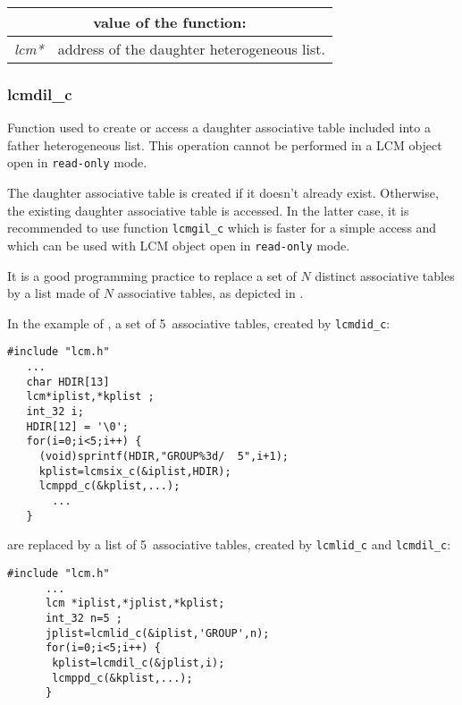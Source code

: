 \vskip 0.8cm

\noindent
\begin{tabular}{|p{4.0cm}|p{11cm}|}
\hline
\multicolumn{2}{|c|}{\bf value of the function:} \\
\hline
{\it lcm*} & address of the daughter heterogeneous list. \\
\hline
\end{tabular}

\subsubsection{lcmdil\_c}

Function used to create or access a daughter associative table included into a father heterogeneous list. This operation cannot be
performed in a LCM object open in {\tt read-only} mode.

\vskip 0.2cm

The daughter associative table is created if it doesn't already exist. Otherwise, the
existing daughter associative table is accessed. In the latter case, it is recommended
to use function {\tt lcmgil\_c} which is faster for a simple access and which can be used
with LCM object open in {\tt read-only} mode.

\vskip 0.2cm

It is a good programming practice to replace a set of $N$ distinct associative tables by a
list made of $N$ associative tables, as depicted in .

\vskip 0.2cm

In the example of , a set of 5~associative tables, created by {\tt lcmdid\_c}:
\begin{verbatim}
#include "lcm.h"
   ...
   char HDIR[13]
   lcm*iplist,*kplist ;
   int_32 i;
   HDIR[12] = '\0';
   for(i=0;i<5;i++) {
     (void)sprintf(HDIR,"GROUP%3d/  5",i+1);
     kplist=lcmsix_c(&iplist,HDIR);
     lcmppd_c(&kplist,...);
       ...
   }
\end{verbatim}

\noindent are replaced by a list of 5~associative tables, created by {\tt lcmlid\_c} and {\tt lcmdil\_c}:

\begin{verbatim}
#include "lcm.h"
      ...
      lcm *iplist,*jplist,*kplist;
      int_32 n=5 ;
      jplist=lcmlid_c(&iplist,'GROUP',n);
      for(i=0;i<5;i++) {
       kplist=lcmdil_c(&jplist,i);
       lcmppd_c(&kplist,...);
      }
\end{verbatim}

